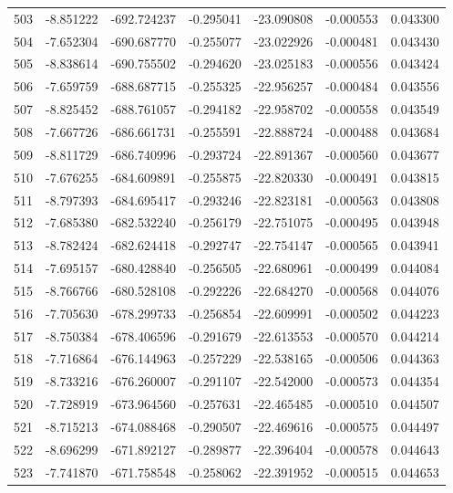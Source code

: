 \begin{tabular}{rrrrrrr}
 503 &  -8.851222 & -692.724237 & -0.295041 &  -23.090808 &   -0.000553 &  0.043300 \\
 504 &  -7.652304 & -690.687770 & -0.255077 &  -23.022926 &   -0.000481 &  0.043430 \\
 505 &  -8.838614 & -690.755502 & -0.294620 &  -23.025183 &   -0.000556 &  0.043424 \\
 506 &  -7.659759 & -688.687715 & -0.255325 &  -22.956257 &   -0.000484 &  0.043556 \\
 507 &  -8.825452 & -688.761057 & -0.294182 &  -22.958702 &   -0.000558 &  0.043549 \\
 508 &  -7.667726 & -686.661731 & -0.255591 &  -22.888724 &   -0.000488 &  0.043684 \\
 509 &  -8.811729 & -686.740996 & -0.293724 &  -22.891367 &   -0.000560 &  0.043677 \\
 510 &  -7.676255 & -684.609891 & -0.255875 &  -22.820330 &   -0.000491 &  0.043815 \\
 511 &  -8.797393 & -684.695417 & -0.293246 &  -22.823181 &   -0.000563 &  0.043808 \\
 512 &  -7.685380 & -682.532240 & -0.256179 &  -22.751075 &   -0.000495 &  0.043948 \\
 513 &  -8.782424 & -682.624418 & -0.292747 &  -22.754147 &   -0.000565 &  0.043941 \\
 514 &  -7.695157 & -680.428840 & -0.256505 &  -22.680961 &   -0.000499 &  0.044084 \\
 515 &  -8.766766 & -680.528108 & -0.292226 &  -22.684270 &   -0.000568 &  0.044076 \\
 516 &  -7.705630 & -678.299733 & -0.256854 &  -22.609991 &   -0.000502 &  0.044223 \\
 517 &  -8.750384 & -678.406596 & -0.291679 &  -22.613553 &   -0.000570 &  0.044214 \\
 518 &  -7.716864 & -676.144963 & -0.257229 &  -22.538165 &   -0.000506 &  0.044363 \\
 519 &  -8.733216 & -676.260007 & -0.291107 &  -22.542000 &   -0.000573 &  0.044354 \\
 520 &  -7.728919 & -673.964560 & -0.257631 &  -22.465485 &   -0.000510 &  0.044507 \\
 521 &  -8.715213 & -674.088468 & -0.290507 &  -22.469616 &   -0.000575 &  0.044497 \\
 522 &  -8.696299 & -671.892127 & -0.289877 &  -22.396404 &   -0.000578 &  0.044643 \\
 523 &  -7.741870 & -671.758548 & -0.258062 &  -22.391952 &   -0.000515 &  0.044653 \\

\end{tabular}
